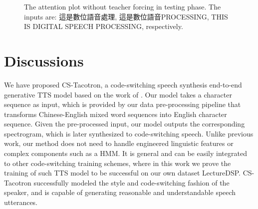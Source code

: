 \documentclass{article} %
\begin{document}
\begin{CJK}{UTF8}{bsmi}
\begin{figure}[h]
\begin{center}
\end{center}
\caption{The attention plot without teacher forcing in testing phase. The inputs are: 這是數位語音處理, 這是數位語音PROCESSING, THIS IS DIGITAL SPEECH PROCESSING, respectively.
}
\end{figure}

\section{Discussions}
We have proposed CS-Tacotron, a code-switching speech synthesis end-to-end generative TTS model based on the work of \citet{Wang2017}. Our model takes a character sequence as input, which is provided by our data pre-processing pipeline that transforms Chinese-English mixed word sequences into English character sequence. Given the pre-processed input, our model outputs the corresponding spectrogram, which is later synthesized to code-switching speech. Unlike previous work, our method does not need to handle engineered linguistic features or complex components such as a HMM. It is general and can be easily integrated to other code-switching training schemes, where in this work we prove the training of such TTS model to be successful on our own dataset LectureDSP. CS-Tacotron successfully modeled the style and code-switching fashion of the speaker, and is capable of generating reasonable and understandable speech utterances.


\end{CJK}
\end{document}
